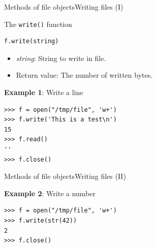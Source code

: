 \documentclass[10pt,compress]{beamer} %
\begin{document}
\begin{frame}[fragile]{Methods of file objects}{Writing files (I)}
	\begin{block}{The \texttt{write()} function}
\begin{verbatim}
f.write(string)
\end{verbatim}

	\vspace{-0.5cm}
	\begin{itemize}
	\item \textit{string}: String to write in file.
	\item Return value: The number of written bytes.
	\end{itemize}
	\end{block}

	\textbf{Example 1}: Write a line
	\begin{verbatim}
>>> f = open("/tmp/file", 'w+')
>>> f.write('This is a test\n')
15
>>> f.read()
'' 
>>> f.close()
\end{verbatim}


\end{frame}

\begin{frame}[fragile]{Methods of file objects}{Writing files (II)}
	

	\textbf{Example 2}: Write a number %
\begin{verbatim}
>>> f = open("/tmp/file", 'w+')
>>> f.write(str(42))
2
>>> f.close()
\end{verbatim}
\end{frame}
\end{document}
